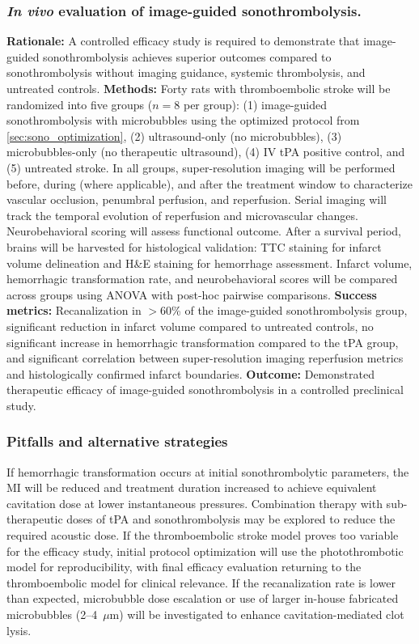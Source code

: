 \subsubsection{\textit{In vivo} evaluation of image-guided sonothrombolysis.\label{sec:efficacy_study}}
\textbf{Rationale:} A controlled efficacy study is required to demonstrate that image-guided sonothrombolysis achieves superior outcomes compared to sonothrombolysis without imaging guidance, systemic thrombolysis, and untreated controls. \textbf{Methods:} Forty rats with thromboembolic stroke will be randomized into five groups ($n=8$ per group): (1) image-guided sonothrombolysis with microbubbles using the optimized protocol from \ref{sec:sono_optimization}, (2) ultrasound-only (no microbubbles), (3) microbubbles-only (no therapeutic ultrasound), (4) IV tPA positive control, and (5) untreated stroke. In all groups, super-resolution imaging will be performed before, during (where applicable), and after the treatment window to characterize vascular occlusion, penumbral perfusion, and reperfusion. Serial imaging will track the temporal evolution of reperfusion and microvascular changes. Neurobehavioral scoring will assess functional outcome. After a survival period, brains will be harvested for histological validation: TTC staining for infarct volume delineation and H\&E staining for hemorrhage assessment. Infarct volume, hemorrhagic transformation rate, and neurobehavioral scores will be compared across groups using ANOVA with post-hoc pairwise comparisons. \textbf{Success metrics:} Recanalization in $>$60\% of the image-guided sonothrombolysis group, significant reduction in infarct volume compared to untreated controls, no significant increase in hemorrhagic transformation compared to the tPA group, and significant correlation between super-resolution imaging reperfusion metrics and histologically confirmed infarct boundaries. \textbf{Outcome:} Demonstrated therapeutic efficacy of image-guided sonothrombolysis in a controlled preclinical study.

\subsubsection{Pitfalls and alternative strategies}
If hemorrhagic transformation occurs at initial sonothrombolytic parameters, the MI will be reduced and treatment duration increased to achieve equivalent cavitation dose at lower instantaneous pressures. Combination therapy with sub-therapeutic doses of tPA and sonothrombolysis may be explored to reduce the required acoustic dose. If the thromboembolic stroke model proves too variable for the efficacy study, initial protocol optimization will use the photothrombotic model for reproducibility, with final efficacy evaluation returning to the thromboembolic model for clinical relevance. If the recanalization rate is lower than expected, microbubble dose escalation or use of larger in-house fabricated microbubbles (2--4~$\mu$m) will be investigated to enhance cavitation-mediated clot lysis.

